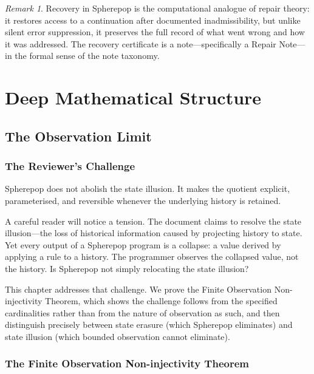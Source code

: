 \documentclass[12pt, a4paper, openany]{book}
\theoremstyle{plain}
\theoremstyle{definition}
\theoremstyle{remark}
\newtheorem{remark}[theorem]{Remark}
\begin{document}
\begin{remark}
Recovery in Spherepop is the computational analogue of repair theory: it restores
access to a continuation after documented inadmissibility, but unlike silent error
suppression, it preserves the full record of what went wrong and how it was
addressed. The recovery certificate is a note---specifically a Repair Note---in
the formal sense of the note taxonomy.
\end{remark}

\part{Deep Mathematical Structure}

\chapter{The Observation Limit}

\section{The Reviewer's Challenge}

Spherepop does not abolish the state illusion. It makes the quotient explicit,
parameterised, and reversible whenever the underlying history is retained.

A careful reader will notice a tension. The document claims to resolve the state
illusion---the loss of historical information caused by projecting history to
state. Yet every output of a Spherepop program is a collapse: a value derived by
applying a rule to a history. The programmer observes the collapsed value, not
the history. Is Spherepop not simply relocating the state illusion?

This chapter addresses that challenge. We prove the Finite Observation
Non-injectivity Theorem, which shows the challenge follows from the specified
cardinalities rather than from the nature of observation as such, and then
distinguish precisely between state erasure (which Spherepop eliminates) and
state illusion (which bounded observation cannot eliminate).
\label{ch:no-direct-observation}

\section{The Finite Observation Non-injectivity Theorem}
\end{document}
